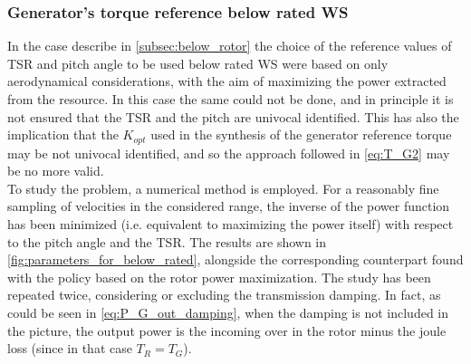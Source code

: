 \subsubsection{Generator's torque reference below rated WS}

In the case describe in \autoref{subsec:below_rotor} the choice of the reference values of TSR and pitch angle to be used below rated WS were based on only aerodynamical considerations, with the aim of maximizing the power extracted from the resource. In this case the same could not be done, and in principle it is not ensured that the TSR and the pitch are univocal identified. This has also the implication that the $K_{opt}$ used in the synthesis of the generator reference torque may be not univocal identified, and so the approach followed in \autoref{eq:T_G2} may be no more valid. \\
To study the problem, a numerical method is employed. For a reasonably fine sampling of velocities in the considered range, the inverse of the power function has been minimized (i.e. equivalent to maximizing the power itself) with respect to the pitch angle and the TSR. The results are shown in \autoref{fig:parameters_for_below_rated}, alongside the corresponding counterpart found with the policy based on the rotor power maximization. The study has been repeated twice, considering or excluding the transmission damping. In fact, as could be seen in \autoref{eq:P_G_out_damping}, when the damping is not included in the picture, the output power is the incoming over in the rotor minus the joule loss (since in that case $T_R=T_G$).
